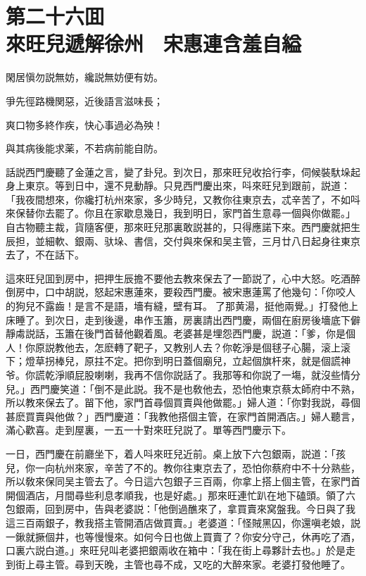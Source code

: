 
\chapter*{第二十六囬　\\來旺兒遞解徐州　宋惠連含羞自縊}


\begin{myquote}
閑居愼勿説無妨，纔説無妨便有妨。

爭先徑路機関惡，近後語言滋味長；

爽口物多終作疾，快心事過必為殃！

與其病後能求薬，不若病前能自防。
\end{myquote}

話説西門慶聽了金蓮之言，變了卦兒。到次日，那來旺兒收拾行李，伺候裝馱垛起身上東京。等到日中，還不見動靜。只見西門慶出來，呌來旺兒到跟前，説道：「我夜間想來，你纔打杭州來家，多少時兒，又教你往東京去，忒辛苦了，不如呌來保替你去罷了。你且在家歇息幾日，我到明日，家門首生意尋一個與你做罷。」自古物聽主裁，貨隨客便，那來旺兒那裏敢説甚的，只得應諾下來。西門慶就把生辰担，並細軟、銀兩、驮垛、書信，交付與來保和吴主管，三月廿八日起身往東京去了，不在話下。

這來旺兒囬到房中，把押生辰擔不要他去教來保去了一節説了，心中大怒。吃酒醉倒房中，口中胡説，怒起宋惠蓮來，要殺西門慶。被宋惠蓮罵了他幾句：「你咬人的狗兒不露齒！是言不是語，墻有縫，壁有耳。𠳹了那黄湯，挺他兩覺。」打發他上床睡了。到次日，走到後邊，串作玉簫，房裏請出西門慶，兩個在廚房後墻底下僻靜䖏説話，玉簫在後門首替他觀着風。老婆甚是埋怨西門慶，説道：「爹，你是個人！你原説教他去，怎麽轉了靶子，又教别人去？你乾淨是個毬子心腸，滚上滚下；燈草拐棒兒，原拄不定。把你到明日蓋個廟兒，立起個旗杆來，就是個謊神爷。你謊乾淨順屁股喇喇，我再不信你説話了。我那等和你説了一塲，就沒些情分兒。」西門慶笑道：「倒不是此説。我不是也敎他去，恐怕他東京蔡太師府中不熟，所以教來保去了。㽞下他，家門首尋個買賣與他做罷。」婦人道：「你對我説，尋個甚麽買賣與他做？」西門慶道：「我教他搭個主管，在家門首開酒店。」婦人聽言，滿心歡喜。走到屋裏，一五一十對來旺兒説了。單等西門慶示下。

一日，西門慶在前廳坐下，着人呌來旺兒近前。桌上放下六包銀兩，説道：「孩兒，你一向杭州來家，辛苦了不的。教你往東京去了，恐怕你蔡府中不十分熟些，所以敎來保同吴主管去了。今日這六包銀子三百兩，你拿上搭上個主管，在家門首開個酒店，月間尋些利息孝順我，也是好處。」那來旺連忙趴在地下磕頭。領了六包銀兩，回到房中，告與老婆説：「他倒過醮來了，拿買賣來窝盤我。今日與了我這三百兩銀子，教我搭主管開酒店做買賣。」老婆道：「怪賊黑囚，你還嗔老娘，説一鍬就撅個井，也等慢慢來。如何今日也做上買賣了？你安分守己，休再吃了酒，口裏六説白道。」來旺兒叫老婆把銀兩收在箱中：「我在街上尋夥計去也。」於是走到街上尋主管。尋到天晚，主管也尋不成，又吃的大醉來家。老婆打發他睡了。

